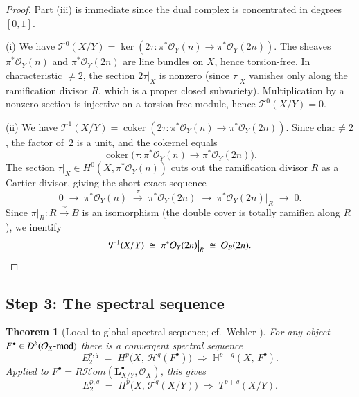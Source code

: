 \documentclass[11pt,twoside]{amsart}
\theoremstyle{plain}
\numberwithin{equation}{section}
\newtheorem{theorem}{Theorem}[section]
\DeclareMathOperator{\coker}{coker}
\newcommand{\OO}{\mathcal{O}}
\theoremstyle{definition}
\newcommand{\LL}{\mathbf{L}}
\newcommand{\cT}{\mathcal{T}}
\newcommand{\cH}{\mathcal{H}}
\begin{document}
\begin{proof}
Part (iii) is immediate since the dual complex is concentrated in degrees $[0,1]$.
 
\medskip
 
\noindent\textup{(i)} We have $\cT^0(X/Y) = \ker(2\tau\colon \pi^*\OO_Y(n) \to \pi^*\OO_Y(2n))$. The sheaves $\pi^*\OO_Y(n)$ and $\pi^*\OO_Y(2n)$ are line bundles on $X$, hence torsion-free. In characteristic $\neq 2$, the section $2\tau\big|_X$ is nonzero (since $\tau\big|_X$ vanishes only along the ramification divisor $R$, which is a proper closed subvariety). Multiplication by a nonzero section is injective on a torsion-free module, hence $\cT^0(X/Y) = 0$.
 
\medskip
 
\noindent\textup{(ii)} We have $\cT^1(X/Y) = \coker(2\tau\colon \pi^*\OO_Y(n) \to \pi^*\OO_Y(2n))$. Since $\mathrm{char} \neq 2$, the factor of~$2$ is a unit, and the cokernel equals
\[
\coker\!\big(\tau\colon \pi^*\OO_Y(n) \to \pi^*\OO_Y(2n)\big).
\]
The section $\tau\big|_X \in H^0(X, \pi^*\OO_Y(n))$ cuts out the ramification divisor $R$ as a Cartier divisor, giving the short exact sequence
\[
0 \;\longrightarrow\; \pi^*\OO_Y(n) \;\xrightarrow{\;\tau\;}\; \pi^*\OO_Y(2n) \;\longrightarrow\; \pi^*\OO_Y(2n)\big|_R \;\longrightarrow\; 0.
\]
Since $\pi\big|_R \colon R \xrightarrow{\;\sim\;} B$ is an isomorphism (the double cover is totally ramifien along $R$), we inentify
\[
\cT^1(X/Y) \;\cong\; \pi^*\OO_Y(2n)\big|_R \;\cong\; \OO_B(2n). \qedhere
\]
\end{proof}
 
\subsection{Step 3: The spectral sequence}
 
\begin{theorem}[Local-to-global spectral sequence; cf.\ Wehler {\cite[1.1]{Wehler}}]\label{thm:ss}
For any object $F^\bullet \in D^b(\OO_X\textup{-mod})$ there is a convergent spectral sequence
\[
E_2^{p,q} \;=\; H^p\!\big(X,\, \cH^q(F^\bullet)\big) \;\Longrightarrow\; \mathbb{H}^{p+q}(X,\, F^\bullet).
\]
Applied to $F^\bullet = R\!\cH\!\mathit{om}(\LL^\bullet_{X/Y}, \OO_X)$, this gives
\[
E_2^{p,q} \;=\; H^p\!\big(X,\, \cT^q(X/Y)\big) \;\Longrightarrow\; T^{p+q}(X/Y).
\]
\end{theorem}
 
\end{document}
